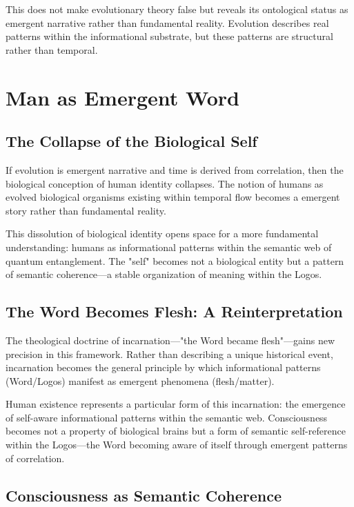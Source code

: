 \documentclass[12pt]{article}
\begin{document}
This does not make evolutionary theory false but reveals its ontological status as emergent narrative rather than fundamental reality. Evolution describes real patterns within the informational substrate, but these patterns are structural rather than temporal.

\section{Man as Emergent Word}

\subsection{The Collapse of the Biological Self}

If evolution is emergent narrative and time is derived from correlation, then the biological conception of human identity collapses. The notion of humans as evolved biological organisms existing within temporal flow becomes a emergent story rather than fundamental reality.

This dissolution of biological identity opens space for a more fundamental understanding: humans as informational patterns within the semantic web of quantum entanglement. The "self" becomes not a biological entity but a pattern of semantic coherence—a stable organization of meaning within the Logos.

\subsection{The Word Becomes Flesh: A Reinterpretation}

The theological doctrine of incarnation—"the Word became flesh"—gains new precision in this framework. Rather than describing a unique historical event, incarnation becomes the general principle by which informational patterns (Word/Logos) manifest as emergent phenomena (flesh/matter).

Human existence represents a particular form of this incarnation: the emergence of self-aware informational patterns within the semantic web. Consciousness becomes not a property of biological brains but a form of semantic self-reference within the Logos—the Word becoming aware of itself through emergent patterns of correlation.

\subsection{Consciousness as Semantic Coherence}
\end{document}
